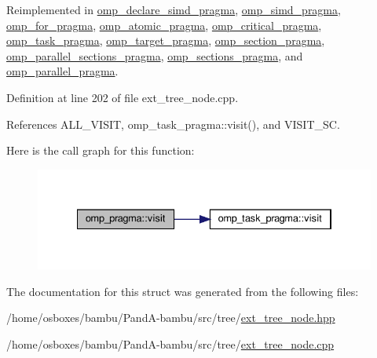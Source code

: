 Reimplemented in \hyperlink{structomp__declare__simd__pragma_a3745037752b1b165a418e50058eed19a}{omp\+\_\+declare\+\_\+simd\+\_\+pragma}, \hyperlink{structomp__simd__pragma_aea58522f1cbf5637c63588430acf77f2}{omp\+\_\+simd\+\_\+pragma}, \hyperlink{structomp__for__pragma_aaedfb731b705c0abadbc9fcb4a7bafef}{omp\+\_\+for\+\_\+pragma}, \hyperlink{structomp__atomic__pragma_adf901941aa33c47235e3b20d17410f63}{omp\+\_\+atomic\+\_\+pragma}, \hyperlink{structomp__critical__pragma_afb58812bf6b4658b1085d45711b25847}{omp\+\_\+critical\+\_\+pragma}, \hyperlink{structomp__task__pragma_ad7ce2ba5852e3a4404ef8dad6c6034be}{omp\+\_\+task\+\_\+pragma}, \hyperlink{structomp__target__pragma_a6b68bf02eef68fa2c841b75afabf06b7}{omp\+\_\+target\+\_\+pragma}, \hyperlink{structomp__section__pragma_af4ab9f80608c36b26779495aacc05e43}{omp\+\_\+section\+\_\+pragma}, \hyperlink{structomp__parallel__sections__pragma_a8f7f1c69bd6c94e4fbe53daf45bb33a7}{omp\+\_\+parallel\+\_\+sections\+\_\+pragma}, \hyperlink{structomp__sections__pragma_ae9dcb45b2796afc06a6b4e4233761837}{omp\+\_\+sections\+\_\+pragma}, and \hyperlink{structomp__parallel__pragma_ac501a81fc5120b8ce8ec7c75fb617b57}{omp\+\_\+parallel\+\_\+pragma}.



Definition at line 202 of file ext\+\_\+tree\+\_\+node.\+cpp.



References A\+L\+L\+\_\+\+V\+I\+S\+IT, omp\+\_\+task\+\_\+pragma\+::visit(), and V\+I\+S\+I\+T\+\_\+\+SC.

Here is the call graph for this function\+:
\nopagebreak
\begin{figure}[H]
\begin{center}
\leavevmode
\includegraphics[width=334pt]{dd/dcc/structomp__pragma_a2e2c445528b7e097ae76fa618a9970b5_cgraph}
\end{center}
\end{figure}


The documentation for this struct was generated from the following files\+:\begin{DoxyCompactItemize}
\item 
/home/osboxes/bambu/\+Pand\+A-\/bambu/src/tree/\hyperlink{ext__tree__node_8hpp}{ext\+\_\+tree\+\_\+node.\+hpp}\item 
/home/osboxes/bambu/\+Pand\+A-\/bambu/src/tree/\hyperlink{ext__tree__node_8cpp}{ext\+\_\+tree\+\_\+node.\+cpp}\end{DoxyCompactItemize}
